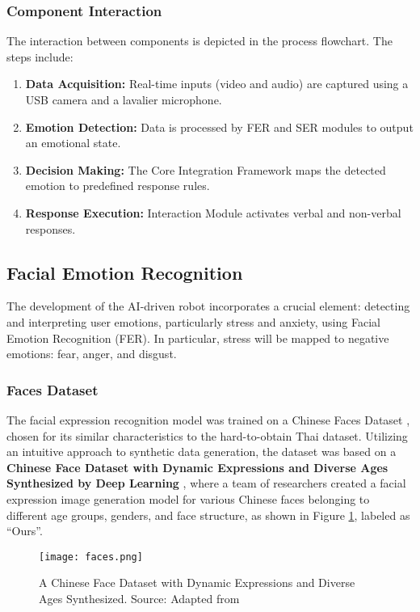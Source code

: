 \subsubsection{Component Interaction}

The interaction between components is depicted in the process flowchart. The steps include:
\begin{enumerate}
    \item\textbf{Data Acquisition:} Real-time inputs (video and audio) are captured using a USB camera and a lavalier microphone.
    \item\textbf{Emotion Detection:} Data is processed by FER and SER modules to output an emotional state.
    \item\textbf{Decision Making:} The Core Integration Framework maps the detected emotion to predefined response rules.
    \item\textbf{Response Execution:} Interaction Module activates verbal and non-verbal responses.
\end{enumerate}

\subsection{Facial Emotion Recognition}
The development of the AI-driven robot incorporates a crucial element: detecting and interpreting user emotions, particularly stress and anxiety, using Facial Emotion Recognition (FER). In particular, stress will be mapped to negative emotions: fear, anger, and disgust.

\subsubsection{Faces Dataset}
The facial expression recognition model was trained on a Chinese Faces Dataset , chosen for its similar characteristics to the hard-to-obtain Thai dataset. Utilizing an intuitive approach to synthetic data generation, the dataset was based on a  \textbf{Chinese Face Dataset with Dynamic Expressions and Diverse Ages Synthesized by Deep Learning} \cite{han-2023}, where a team of researchers created a facial expression image generation model for various Chinese faces belonging to different age groups, genders, and face structure, as shown in Figure \ref{fig:face}, labeled as “Ours”.

\begin{figure}[ht]
    \centering
    \captionsetup{justification=centering}
    \texttt{[image: faces.png]}
    \caption{ A Chinese Face Dataset with Dynamic Expressions and Diverse Ages Synthesized. Source: Adapted from \cite{han-2023}}
    \label{fig:face}
\end{figure}


